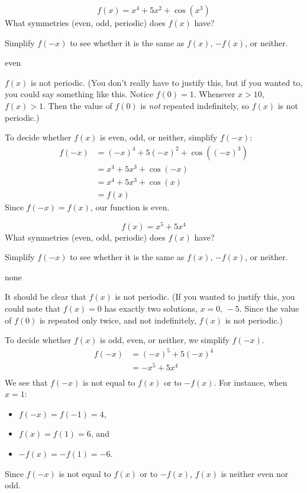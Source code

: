 
\begin{Mquestion}\label{s3.6.4eqfirst}
\[f(x)=x^4+5x^2+\cos\left(x^3\right)\]
What symmetries (even, odd, periodic) does $f(x)$ have?
\end{Mquestion}
\begin{hint}
Simplify $f(-x)$ to see whether it is the same as $f(x)$, $-f(x)$, or neither.
\end{hint}
\begin{answer}
even
\end{answer}
\begin{solution}
$f(x)$ is not periodic. (You don't really have to justify this, but if you wanted to, you could say something like this. Notice $f(0)=1$. Whenever $x>10$, $f(x)>1$. Then the value of $f(0)$ is \emph{not} repeated indefinitely, so $f(x)$ is not periodic.)

To decide whether $f(x)$ is even, odd, or neither, simplify $f(-x)$:
\begin{align*}
f(-x)&=(-x)^4+5(-x)^2+\cos\left((-x)^3\right)\\
&=x^4+5x^3+\cos(-x)\\&=x^4+5x^3+\cos(x)\\
&=f(x)
\end{align*}
Since $f(-x)=f(x)$, our function is even.
\end{solution}

\begin{question}
\[f(x)=x^5+5x^4\]
What symmetries (even, odd, periodic) does $f(x)$ have?
\end{question}
\begin{hint}
Simplify $f(-x)$ to see whether it is the same as $f(x)$, $-f(x)$, or neither.
\end{hint}
\begin{answer}
none
\end{answer}
\begin{solution}
It should be clear that $f(x)$ is not periodic.  (If you wanted to justify this, you could note that $f(x)=0$ has exactly two solutions, $x=0,\,-{5}$. Since the value of $f(0)$ is repeated only twice, and not indefinitely, $f(x)$ is not periodic.)

To decide whether $f(x)$ is odd, even, or neither, we simplify $f(-x)$.
\begin{align*}
f(-x)&=(-x)^5+5(-x)^{4}\\
&=-x^5+5x^4\\
\end{align*}
We see that  $f(-x)$ is not equal to $f(x)$ or to $-f(x)$.
For instance, when $x=1$:
\begin{itemize}
\item $f(-x)=f(-1)=4$,
\item $f(x)=f(1)=6$, and
\item $-f(x)=-f(1)=-6$. \end{itemize}
Since $f(-x)$ is not equal to $f(x)$ or to $-f(x)$, $f(x)$ is neither even nor odd.
\end{solution}


